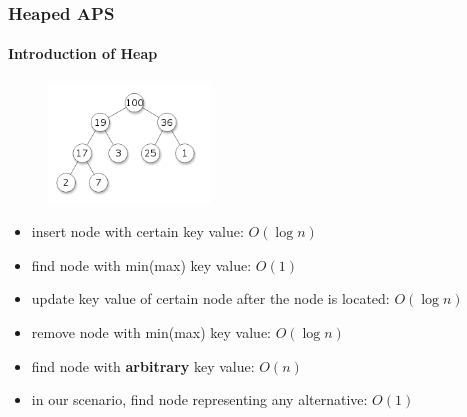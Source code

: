 \documentclass{beamer}
\begin{document}
\begin{frame}
\frametitle{Heaped APS}
\framesubtitle{Introduction of Heap}
\begin{figure}[ht]
\centering
\includegraphics[height=32mm]{heap.png}
\end{figure}
\begin{itemize}
\item insert node with certain key value: $O(\log n)$
\item find node with min(max) key value: $O(1)$
\item update key value of certain node after the node is located: $O(\log n)$
\item remove node with min(max) key value: $O(\log n)$
\item find node with {\bf arbitrary} key value: $O(n)$
\vspace{\baselineskip}
\item {\color{blue} in our scenario, find node representing any alternative: $O(1)$}
\end{itemize}
\end{frame}

\end{document}
